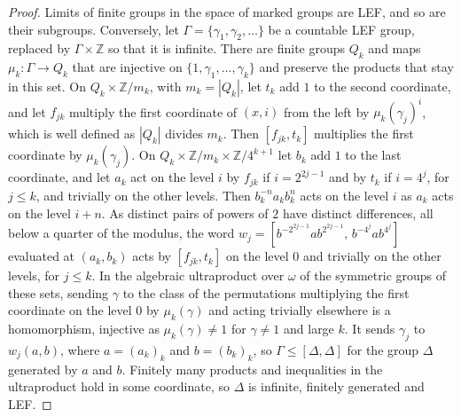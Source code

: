\documentclass[11pt]{amsart}
\newcommand{\Z}{\mathbb Z}
\begin{document}
\begin{proof}
Limits of finite groups in the space of marked groups are LEF, and so are
their subgroups. Conversely, let $\Gamma=\{\gamma_1,\gamma_2,\dots\}$ be a
countable LEF group, replaced by $\Gamma\times\Z$ so that it is infinite.
There are finite groups $Q_k$ and maps $\mu_k\colon\Gamma\to Q_k$ that are
injective on $\{1,\gamma_1,\dots,\gamma_k\}$ and preserve the products
that stay in this set. On $Q_k\times\Z/m_k$, with $m_k=|Q_k|$, let $t_k$
add $1$ to the second coordinate, and let $f_{jk}$ multiply the first
coordinate of $(x,i)$ from the left by $\mu_k(\gamma_j)^i$, which is well
defined as $|Q_k|$ divides $m_k$. Then $[f_{jk},t_k]$ multiplies the first
coordinate by $\mu_k(\gamma_j)$. On $Q_k\times\Z/m_k\times\Z/4^{k+1}$ let
$b_k$ add $1$ to the last coordinate, and let $a_k$ act on the level $i$
by $f_{jk}$ if $i=2^{2j-1}$ and by $t_k$ if $i=4^j$, for $j\le k$, and
trivially on the other levels. Then $b_k^{-n}a_kb_k^n$ acts on the level
$i$ as $a_k$ acts on the level $i+n$. As distinct pairs of powers of $2$
have distinct differences, all below a quarter of the modulus, the word
$w_j=[b^{-2^{2j-1}}ab^{2^{2j-1}},\,b^{-4^j}ab^{4^j}]$ evaluated at
$(a_k,b_k)$ acts by $[f_{jk},t_k]$ on the level $0$ and trivially on the
other levels, for $j\le k$. In the algebraic ultraproduct over $\omega$ of
the symmetric groups of these sets, sending $\gamma$ to the class of the
permutations multiplying the first coordinate on the level $0$ by
$\mu_k(\gamma)$ and acting trivially elsewhere is a homomorphism,
injective as $\mu_k(\gamma)\ne1$ for $\gamma\ne1$ and large $k$. It sends
$\gamma_j$ to $w_j(a,b)$, where $a=(a_k)_k$ and $b=(b_k)_k$, so
$\Gamma\le[\Delta,\Delta]$ for the group $\Delta$ generated by $a$ and $b$.
Finitely many products and inequalities in the ultraproduct hold in some
coordinate, so $\Delta$ is infinite, finitely generated and LEF.


\end{proof}
\end{document}

